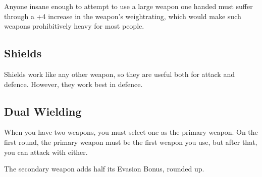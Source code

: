 \begin{multicols}{2}
Anyone insane enough to attempt to use a large weapon one handed must suffer through a +4 increase in the weapon's \gls{weightrating}, which would make such weapons prohibitively heavy for most people.

\subsection{Shields}

Shields work like any other weapon, so they are useful both for attack and defence.
However, they work best in defence.

\subsection{Dual Wielding}
\label{dualWielding}

When you have two weapons, you must select one as the primary weapon.
On the first round, the primary weapon must be the first weapon you use, but after that, you can attack with either.

The secondary weapon adds half its Evasion Bonus, rounded up.

\end{multicols}

\newcommand{\armourchart}{

	\begin{tcolorbox}[tabularx={ccccX},bottom=10pt,top=10pt,left=3pt,right=3pt]

	\textbf{Armour} & \textbf{\glsentrytext{dr}} & \textbf{Weight} & \textbf{Noise} & \textbf{Price} \\\hline

	\textbf{Partial} \\\hline

	Elvish & 2 & -2 & 0 & 3gp \\

	Padded & 2 & 0 & 0 & 1sp \\

	Leather & 3 & 0 & 0 & 5sp \\

	Chain & 4 &  1 & 1 & 10sp \\

	Plate & 5 &  2 & 4 & 12gp \\
	\hline

	\textbf{Complete} \\\hline

	Elvish & 2 & -1  & 0 & 9gp \\

	Padded & 2 & 1  & 0 & 3sp \\

	Leather & 3 & 1  & 1 & 15sp \\

	Chain & 4 &  2  & 2 & 30sp \\

	Plate & 5 &  3  & 5 & 36gp \\

	\end{tcolorbox}
}

